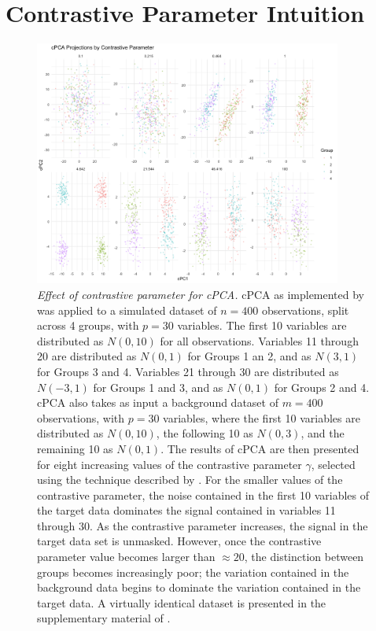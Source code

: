 \documentclass{article}
\begin{document}
\newpage

\section{Contrastive Parameter Intuition}

\begin{figure}[!htbp]
    \centering
    \includegraphics[width=0.9\textwidth]{figures/cpca_example_plot}
    \caption{
    {\em Effect of contrastive parameter for cPCA.}
    cPCA as implemented by \citet{Abid2018} was applied to a simulated dataset of $n=400$ observations, split across 4 groups, with $p=30$ variables. The first 10 variables are distributed as $N(0, 10)$ for all observations. Variables 11
    through 20 are distributed as $N(0, 1)$ for Groups 1 an 2, and as $N(3, 1)$
    for Groups 3 and 4. Variables 21 through 30 are distributed as $N(-3, 1)$
    for Groups 1 and 3, and as $N(0, 1)$ for Groups 2 and 4. cPCA also takes
    as input a background dataset of $m=400$ observations, with $p=30$
    variables, where the first 10 variables are distributed as $N(0, 10)$, the
    following 10 as $N(0, 3)$, and the remaining 10 as $N(0, 1)$. The results
    of cPCA are then presented for eight increasing values of the contrastive
    parameter $\gamma$, selected using the technique described by \citet{Abid2018}. For the smaller values of the contrastive parameter, the
    noise contained in the first 10 variables of the target data dominates the
    signal contained in variables 11 through 30. As the contrastive parameter
    increases, the signal in the target data set is unmasked. However, once the
    contrastive parameter value becomes larger than $\approx 20$, the
    distinction between groups becomes increasingly poor; the variation
    contained in the background data begins to dominate the variation contained
    in the target data. A virtually identical dataset is presented in the
    supplementary material of \citet{Abid2018}.}
    \label{contrastive_par}
\end{figure}
\end{document}
